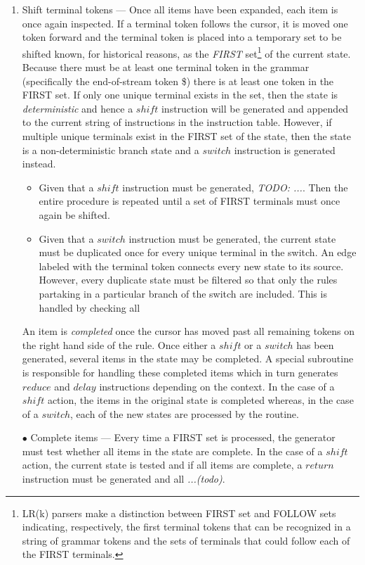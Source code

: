 \documentclass[a4paper,11pt]{article}
\begin{document}
\begin{enumerate}
\item Shift terminal tokens --- Once all items have been expanded, each item is once again inspected. 
If a terminal token follows the cursor, it is moved one token forward and the terminal token is placed into a temporary set to be shifted 
known, for historical reasons, 
as the \emph{FIRST} set\footnote{LR(k) parsers make a distinction between FIRST set and FOLLOW sets indicating, respectively, 
the first terminal tokens that can be recognized in a string of grammar tokens and the sets of terminals that could follow each of the FIRST terminals.} of the current state.
Because there must be at least one terminal token in the grammar (specifically the end-of-stream token \$) there is at least one token in the FIRST set.
If only one unique terminal exists in the set, then the state is \emph{deterministic} and hence a $shift$ instruction will be generated and appended to the current string of instructions in the instruction table.
However, if multiple unique terminals exist in the FIRST set of the state, then the state is a non-deterministic branch state and a $switch$ instruction is generated instead.
\begin{itemize}
\item Given that a $shift$ instruction must be generated, \emph{TODO: ...}. Then the entire procedure is repeated until a set of FIRST terminals must once again be shifted.
\item Given that a $switch$ instruction must be generated, the current state must be duplicated once for every unique terminal in the switch. 
An edge labeled with the terminal token connects every new state to its source.
However, every duplicate state must be filtered so that only the rules partaking in a particular branch of the switch are included.
This is handled by checking all 
\end{itemize}
An item is \emph{completed} once the cursor has moved past all remaining tokens on the right hand side of the rule.
Once either a $shift$ or a $switch$ has been generated, several items in the state may be completed. 
A special subroutine is responsible for handling these completed items which in turn generates $reduce$ and $delay$ instructions depending on the context.
In the case of a $shift$ action, the items in the original state is completed whereas, in the case of a $switch$, each of the new states are processed by the routine.\\

\item[$\bullet$] Complete items --- Every time a FIRST set is processed, the generator must test whether all items in the state are complete. 
In the case of a $shift$ action, the current state is tested and if all items are complete, a $return$ instruction must be generated and all \emph{...(todo)}.
\end{enumerate}
\end{document}

